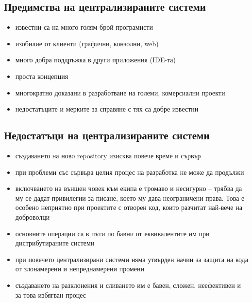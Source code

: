 \documentclass[a4paper]{article}
\begin{document}
  \vspace{10 pt}


  \subsection{Предимства на централизираните системи}
    \begin{itemize}
      \item известни са на много голям брой програмисти
      \item изобилие от клиенти (графични, конзолни, web)
      \item много добра поддръжка в други приложения (IDE-та)
      \item проста концепция
      \item многократно доказани в разработване на големи, комерсиални проекти
      \item недостатъците и мерките за справяне с тях са добре известни
    \end{itemize}

  \subsection{Недостатъци на централизираните системи}
    \begin{itemize}
      \item създаването на ново repository изисква повече време и сървър
      \item при проблеми със сървъра целия процес на разработка не може да продължи
      \item включването на външен човек към екипа е тромаво и несигурно -- трябва да му се дадат привилегии за писане, което му дава неограничени права. Това е особено неприятно при проектите с отворен код, които разчитат най-вече на доброволци
      \item основните операции са в пъти по бавни от еквивалентите им при дистрибутираните системи
      \item при повечето централизирани системи няма утвърден начин за защита на кода от злонамерени и непреднамерени промени
      \item създаването на разклонения и сливането им е бавен, сложен, неефективен и за това избягван процес
    \end{itemize}
\end{document}
